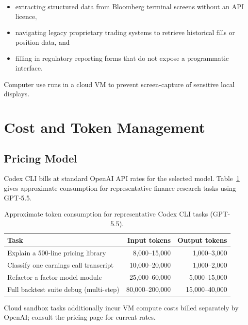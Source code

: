 \begin{itemize}
  \item extracting structured data from Bloomberg terminal screens without an
        API licence,
  \item navigating legacy proprietary trading systems to retrieve historical
        fills or position data, and
  \item filling in regulatory reporting forms that do not expose a programmatic
        interface.
\end{itemize}

Computer use runs in a cloud VM to prevent screen-capture of sensitive local
displays.

\section{Cost and Token Management}
\label{app:codex:cost}

\subsection{Pricing Model}
\label{app:codex:pricing}

Codex CLI bills at standard OpenAI API rates for the selected model.
Table~\ref{tab:codex-token-costs} gives approximate consumption for
representative finance research tasks using GPT-5.5.

\begin{table}[ht]
\centering
\caption{Approximate token consumption for representative Codex CLI tasks (GPT-5.5).}
\label{tab:codex-token-costs}
\begin{tabular}{lrr}
\toprule
\textbf{Task} & \textbf{Input tokens} & \textbf{Output tokens} \\
\midrule
Explain a 500-line pricing library    & 8{,}000--15{,}000   & 1{,}000--3{,}000 \\
Classify one earnings call transcript & 10{,}000--20{,}000  & 1{,}000--2{,}000 \\
Refactor a factor model module        & 25{,}000--60{,}000  & 5{,}000--15{,}000 \\
Full backtest suite debug (multi-step) & 80{,}000--200{,}000 & 15{,}000--40{,}000 \\
\bottomrule
\end{tabular}
\end{table}

Cloud sandbox tasks additionally incur VM compute costs billed separately by
OpenAI; consult the pricing page for current rates.

